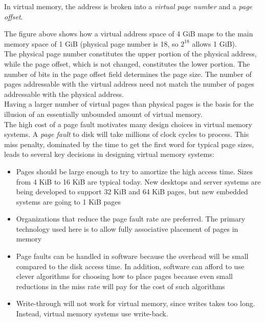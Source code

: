 \documentclass[12pt]{article}
\theoremstyle{definition}
\begin{document}
  In virtual memory, the address is broken into a \emph{virtual page number} and a \emph{page offset}.

  \begin{figure}[H]
  \end{figure}

  The figure above shows how a virtual address space of 4 GiB maps to the main memory space of 1 GiB (physical page number is 18, so $2^{18}$ allows 1 GiB). \\
  The physical page number constitutes the upper portion of the physical address, while the page offset, which is not changed, constitutes the lower portion.
  The number of bits in the page offset field determines the page size.
  The number of pages addressable with the virtual address need not match the number of pages addressable with the physical address. \\
  Having a larger number of virtual pages than physical pages is the basis for the illusion of an essentially unbounded amount of virtual memory. \\

  The high cost of a page fault motivates many design choices in virtual memory systems.
  A \emph{page fault} to disk will take millions of clock cycles to process.
  This miss penalty, dominated by the time to get the first word for typical page sizes, leads to several key decisions in designing virtual memory systems:
  \begin{itemize}
    \item Pages should be large enough to try to amortize the high access time.
    Sizes from 4 KiB to 16 KiB are typical today.
    New desktops and server systems are being developed to support 32 KiB and 64 KiB pages, but new embedded systems are going to 1 KiB pages
    \item Organizations that reduce the page fault rate are preferred.
    The primary technology used here is to allow fully associative placement of pages in memory
    \item Page faults can be handled in software because the overhead will be small compared to the disk access time.
    In addition, software can afford to use clever algorithms for choosing how to place pages because even small reductions in the miss rate will pay for the cost of such algorithms
    \item Write-through will not work for virtual memory, since writes takes too long.
    Instead, virtual memory systems use write-back.
  \end{itemize}
\end{document}
